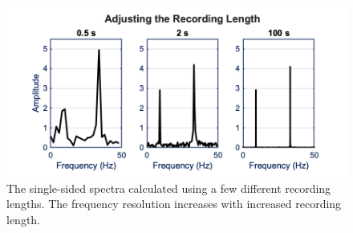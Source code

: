 \begin{figure}[H]
    \centering
    \includegraphics[width = 6 in]{Chapters/Signal Processing/Figures/Adjusting the Recording Length.png}
    \caption{The single-sided spectra calculated using a few different recording lengths. The frequency resolution increases with increased recording length.}
    \label{fig:Adjusting the Recording Length for FFT}
\end{figure}